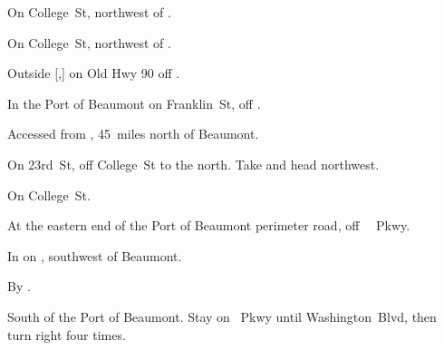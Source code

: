 

\begin{LocationList}

On  College~St, northwest of  .

On  College~St, northwest of  .

Outside [,] on Old Hwy 90 off  .

In the Port of Beaumont on Franklin~St, off  \MLKing.

Accessed from , 45~miles north of Beaumont.

On 23rd~St, off  College~St to the north.
Take   and head northwest.

\Location{\GarageHQ \Garage}
On  College~St.

At the eastern end of the Port of Beaumont perimeter road, off~ \MLKing~Pkwy.

\Location{\TruckService \Service}
In  on , southwest of Beaumont.

\Location{\TruckStop \Gas \Rest \Weigh}
By  .

South of the Port of Beaumont.
Stay on  \MLKing~Pkwy until Washington~Blvd, then turn right four times.

\end{LocationList}

